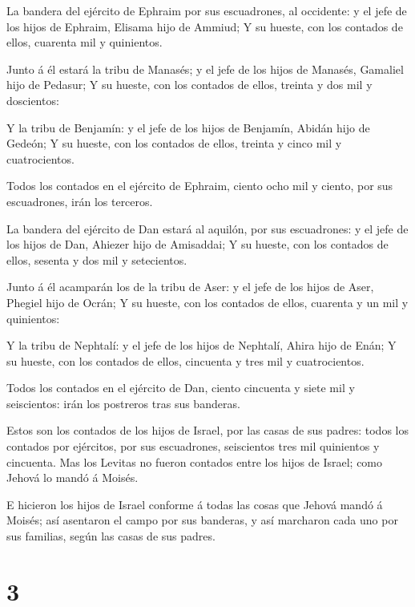  La bandera del ejército de Ephraim por sus escuadrones, al
occidente: y el jefe de los hijos de Ephraim, Elisama hijo de Ammiud;
 Y su hueste, con los contados de ellos, cuarenta mil y
quinientos.

 Junto á él estará la tribu de Manasés; y el jefe de los
hijos de Manasés, Gamaliel hijo de Pedasur;  Y su hueste,
con los contados de ellos, treinta y dos mil y doscientos:

 Y la tribu de Benjamín: y el jefe de los hijos de
Benjamín, Abidán hijo de Gedeón;  Y su hueste, con los
contados de ellos, treinta y cinco mil y cuatrocientos.

 Todos los contados en el ejército de Ephraim, ciento ocho
mil y ciento, por sus escuadrones, irán los terceros.

 La bandera del ejército de Dan estará al aquilón, por sus
escuadrones: y el jefe de los hijos de Dan, Ahiezer hijo de Amisaddai;
 Y su hueste, con los contados de ellos, sesenta y dos mil
y setecientos.

 Junto á él acamparán los de la tribu de Aser: y el jefe de
los hijos de Aser, Phegiel hijo de Ocrán;  Y su hueste, con
los contados de ellos, cuarenta y un mil y quinientos:

 Y la tribu de Nephtalí: y el jefe de los hijos de
Nephtalí, Ahira hijo de Enán;  Y su hueste, con los
contados de ellos, cincuenta y tres mil y cuatrocientos.

 Todos los contados en el ejército de Dan, ciento cincuenta
y siete mil y seiscientos: irán los postreros tras sus banderas.

 Estos son los contados de los hijos de Israel, por las
casas de sus padres: todos los contados por ejércitos, por sus
escuadrones, seiscientos tres mil quinientos y cincuenta. 
Mas los Levitas no fueron contados entre los hijos de Israel; como
Jehová lo mandó á Moisés.

 E hicieron los hijos de Israel conforme á todas las cosas
que Jehová mandó á Moisés; así asentaron el campo por sus banderas, y
así marcharon cada uno por sus familias, según las casas de sus padres.

\hypertarget{section-2}{%
\section{3}\label{section-2}}

